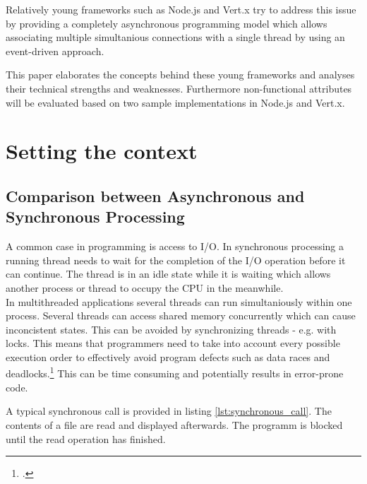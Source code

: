 Relatively young frameworks such as Node.js and Vert.x try to address this issue 
by providing a completely asynchronous programming model which allows associating
multiple simultanious connections with a single thread by using an event-driven approach.

This paper elaborates the concepts behind these young frameworks and analyses their 
technical strengths and weaknesses. Furthermore non-functional attributes will be
evaluated based on two sample implementations in Node.js  and Vert.x.



\newpage
\section{Setting the context}
\label{setting_the_context}

\subsection{Comparison between Asynchronous and Synchronous Processing}
\label{comparison}

A common case in programming is access to I/O.
In synchronous processing a running thread needs to wait for the completion of
the I/O operation before it can continue.
The thread is in an idle state while it is waiting which allows another process 
or thread to occupy the CPU in the meanwhile.\\

In multithreaded applications several threads can run simultaniously within one 
process. Several threads can access shared memory concurrently which can
cause inconcistent states. This can be avoided by synchronizing threads - e.g.
with locks. This means that programmers need to take into account every possible
execution order to effectively avoid program defects such as data races and 
deadlocks.\footcite[Cf.][10]{Breshears_2009}
This can be time consuming and potentially results in error-prone code.

A typical synchronous call is provided in listing \ref{lst:synchronous_call}. The
contents of a file are read and displayed afterwards. The programm is blocked until the
read operation has finished.




